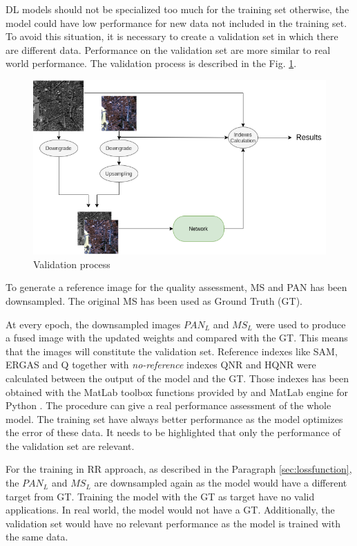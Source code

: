 \documentclass[12pt]{report}
\begin{document}
DL models should not be specialized too much for the training set otherwise, the model could have low performance for new data not included in the training set.
To avoid this situation, it is necessary to create a validation set in which there are different data. 
Performance on the validation set are more similar to real world performance.
The validation process is described in the Fig. \ref{fig:validation}.

\begin{figure}[t]
    \centering
    \includegraphics[scale=.5]{validation.png}
    \caption{Validation process}
    \label{fig:validation}
\end{figure}

To generate a reference image for the quality assessment, MS and PAN has been downsampled.
The original MS has been used as Ground Truth (GT).

At every epoch, the downsampled images $PAN_L$ and $MS_L$ were used 
to produce a fused image with the updated weights and compared with the GT.
This means that the images will constitute the validation set. 
Reference indexes like SAM, ERGAS and Q together with \textit{no-reference} indexes QNR and HQNR were calculated between the output of the model and the GT.
Those indexes has been obtained with the MatLab toolbox functions provided by \cite{criticalComparison} and MatLab engine 
for Python \cite{matlab}.
The procedure can give a real performance assessment of the whole model.
The training set have always better performance as the model optimizes the 
error of these data. It needs to be highlighted that only the performance of the validation set are relevant. 

For the training in RR approach, as described in the Paragraph \ref{sec:lossfunction}, the $PAN_L$ and $MS_L$ are downsampled again as the model
would have a different target from GT.
Training the model with the GT as target have no valid applications.
In real world, the model would not have a GT.
Additionally, the validation set would have no relevant performance as the model is trained with the same data.
\end{document}
